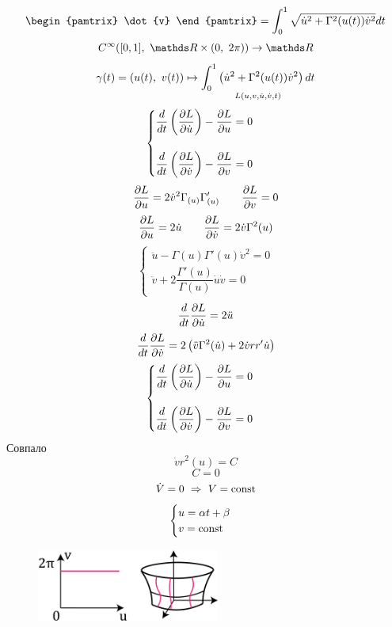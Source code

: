 \documentclass[main]{sub\Phiiles}
\begin{document}
\begin{Sol}
\[\begin{pamtrix}
          \dot{v}
        \end{pamtrix} = \int_0^1 \sqrt{\dot{u}^2 + \Gamma^2(u(t)) \dot{v}^2} dt\]
        \[C^{\infty}([0,1],\ \R \times (0,\ 2\pi)) \ra \R\]
        \[\gamma(t) = (u(t),\ v(t)) \mapsto \underset{L(u,v,\dot{u},\dot{v},t)}{\int_0^1 \left(\dot{u}^2 + \Gamma^2(u(t)) \dot{v}^2\right) dt}\]
        \[\begin{cases}
            \dfrac{d}{dt} \left(\dfrac{\partial L}{\partial \dot{u}}\right) - \dfrac{\partial L}{\partial u} = 0\\ \\
            \dfrac{d}{dt} \left(\dfrac{\partial L}{\partial \dot{v}}\right) - \dfrac{\partial L}{\partial v} = 0
        \end{cases}\]
        \[\dfrac{\partial L}{\partial u} = 2 \dot{v}^2 \Gamma_{(u)} \Gamma_{(u)}' \qquad \dfrac{\partial L}{\partial v} = 0\]
        \[\dfrac{\partial L}{\partial u} = 2 \dot{u} \qquad \dfrac{\partial L}{\partial \dot{v}} = 2 \dot{v} \Gamma^2(u)\]
        \[\begin{cases}
            \ddot{u} - \Gamma(u) \Gamma'(u) \dot{v}^2 = 0\\
            \ddot{v} + 2 \dfrac{\Gamma'(u)}{\Gamma(u)} \dot{u} \dot{v} = 0
        \end{cases}\]
        \[\dfrac{d}{dt}\dfrac{\partial L}{\partial \dot{u}} = 2 \ddot{u}\]
        \[\dfrac{d}{dt}\dfrac{\partial L}{\partial \dot{v}} = 2 \left(\ddot{v} \Gamma^2(\dot{u}) + 2\dot{v} r r' \dot{u}\right)\]
        \[\begin{cases}
            \dfrac{d}{dt} \left(\dfrac{\partial L}{\partial \dot{u}}\right) - \dfrac{\partial L}{\partial u} = 0\\ \\
            \dfrac{d}{dt} \left(\dfrac{\partial L}{\partial \dot{v}}\right) - \dfrac{\partial L}{\partial v} = 0
        \end{cases}\]
        Совпало
        \[\dot{v} r^2 (u) = C\]
        \[C = 0\]
        \[\dot{V} = 0 \ \Rightarrow\  V = \mathop{\rm const}\nolimits\]
        \[\begin{cases}
            u = \alpha t + \beta\\
            v = \mathop{\rm const}\nolimits
        \end{cases}\]
        \begin{figure}[H]
            \centering
            \includegraphics[width=6cm]{pics/15_2}
        \end{figure}
    \end{Sol}
\end{document}
